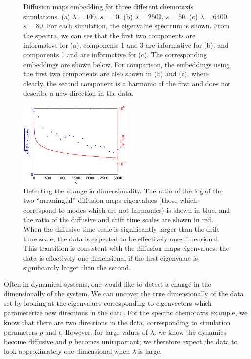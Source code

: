 \documentclass[preprint]{elsarticle}
\begin{document}
\begin{figure}
\begin{subfigure}[t]{0.35\textwidth}
\caption{}
\end{subfigure}
%
\caption{Diffusion maps embedding for three different chemotaxis simulations. (a) $\lambda = 100$, $s = 10$. (b) $\lambda = 2500$, $s = 50$. (c) $\lambda = 6400$, $s = 80$. For each simulation, the eigenvalue spectrum is shown. From the spectra, we can see that the first two components are informative for (a), components 1 and 3 are informative for (b), and components 1 and  are informative for (c). The corresponding embeddings are shown below. For comparison, the embeddings using the first two components are also shown in (b) and (c), where clearly, the second component is a harmonic of the first and does not describe a new direction in the data. }
%
\label{fig:chemotaxis_simulations_harmonics}
\end{figure}

\begin{figure}[t]
%
\centering
\includegraphics[width=0.5\textwidth]{chemotaxis_compare_timescales_evals}
%
\caption{Detecting the change in dimensionality. The ratio of the log of the two ``meaningful'' diffusion maps eigenvalues (those which correspond to modes which are not harmonics) is shown in blue, and the ratio of the diffusive and drift time scales are shown in red. When the diffusive time scale is significantly larger than the drift time scale, the data is expected to be effectively one-dimensional. This transition is consistent with the diffusion maps eigenvalues: the data is effectively one-dimensional if the first eigenvalue is significantly larger than the second. }
%
\label{fig:chemotaxis_compare_timescales_evals}
%
\end{figure}

Often in dynamical systems, one would like to detect a change in the dimensionally of the system. 
%
We can uncover the true dimensionally of the data set by looking at the eigenvalues corresponding to eigenvectors which parameterize new directions in the data. 
%
For the specific chemotaxis example, we know that there are two directions in the data, corresponding to simulation parameters $p$ and $t$. 
%
However, for large values of $\lambda$, we know the dynamics become diffusive and $p$ becomes unimportant; we therefore expect the data to look approximately one-dimensional when $\lambda$ is large. 
\end{document}
